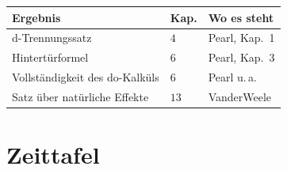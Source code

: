 \begin{merksatz}
\begin{center}
{\small
\renewcommand{\arraystretch}{1.5}
\begin{tabular}{@{}P{3.4cm}P{1.2cm}P{3.4cm}@{}}
\toprule
\textbf{Ergebnis} & \textbf{Kap.} & \textbf{Wo es steht}\\
\midrule
d-Trennungssatz & $4$ & Pearl, Kap.\ 1\\
Hintertürformel & $6$ & Pearl, Kap.\ 3\\
Vollständigkeit des do-Kalküls & $6$ & Pearl u.\,a.\\
Satz über natürliche Effekte & $13$ & VanderWeele\\
\bottomrule
\end{tabular}}
\end{center}

\begin{center}
\begin{minipage}{0.88\textwidth}
\end{minipage}
\end{center}
\end{merksatz}

\section{Zeittafel}

